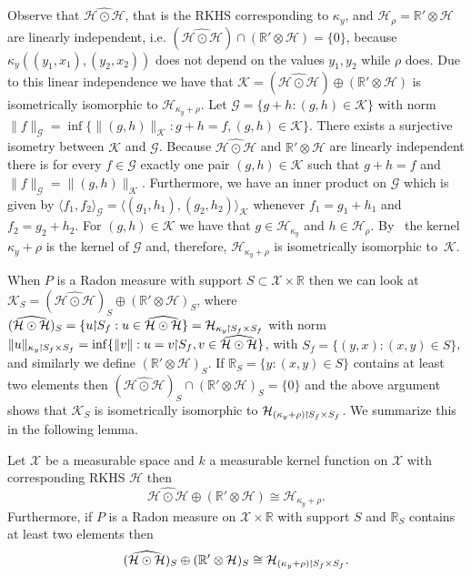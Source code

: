\documentclass[AHL,Unicode,longabstracts,published]{cedram}
\theoremstyle{remark}
\newcommand{\restrr}
{\!\!\upharpoonright\!\!}
\newcommand{\R}{\mathbb{R}}
\newcommand{\dR}{{\R'}}
\newcommand{\X}{\mathcal{X}}
\newcommand{\cH}{\mathcal{H}}
\newcommand{\clK}{\mathcal{K}}
\newcommand{\clG}{\mathcal{G}}
\newcommand*{\mk}{\mkern -1mu}
\begin{document}
Observe that $\widehat{\cH \odot \cH}$, that is the RKHS corresponding to $\kappa_y$, and $\cH_\rho = \dR \otimes \cH$ are linearly independent, i.e. $(\widehat{\cH\odot \cH}) \cap (\dR \otimes \cH) = \{0\}$, because $\kappa_y((y_1,x_1),(y_2,x_2))$ does not depend on the values $y_1,y_2$ while $\rho$ does. Due to this linear independence we have that $\clK = (\widehat{\cH \odot \cH}) \oplus (\dR \otimes \cH)$ is isometrically isomorphic to $\cH_{\kappa_y + \rho}$. Let $\clG = \{g + h : (g,h) \in \clK \}$ with norm $\|f \|_\clG = \inf \{\|(g,h)\|_{\clK} : g+ h = f, (g,h) \in \clK \}$. There exists a surjective isometry between $\clK$ and $\clG$. Because $\widehat{\cH \odot \cH}$ and $\dR \otimes \cH$ are linearly independent there is for every $ f\in \clG$ exactly one pair $(g,h) \in \clK$ such that $g + h = f$ and $\|f\|_\clG = \|(g,h)\|_\clK$. Furthermore, we have an inner product on $\clG$ which is given by $\langle f_1, f_2 \rangle_\clG = \langle (g_1,h_1), (g_2,h_2) \rangle_\clK$ whenever $f_1 = g_1 + h_1$ and $f_2 = g_2 + h_2$. For $(g,h) \in \clK$ we have that $g\in \cH_{\kappa_y}$ and $h \in \cH_{\rho}$. By~\cite[Theorem, p.~353]{ARON50} the kernel $\kappa_y + \rho$ is the kernel of $\clG$ and, therefore, $\cH_{\kappa_y + \rho}$ is isometrically isomorphic to~$\clK$.

When $P$ is a Radon measure with support $S \subset \X \times \R$ then we can look at $\clK_S = (\widehat{\cH \odot \cH})_S \oplus (\R' \otimes \cH)_S$, where $(\widehat{\cH \odot \cH})_S = \{u \restrr S_f : u\in \widehat{\cH \odot \cH}\}= \cH_{\kappa_y\mk\upharpoonright\mk S_f \times S_f} $ with norm $\|u\|_{\kappa_y\mk\upharpoonright\mk S_f \times S_f} = \inf \{ \|v\| : u = v \restrr S_f, v \in \widehat{\cH \odot \cH} \}$, with $S_f = \{(y,x) : (x,y) \in S\}$, and similarly we define $(\R' \otimes \cH)_S$. If $\R_S = \{y : (x,y) \in S \}$ contains at least two elements then $(\widehat{\cH \odot \cH})_S \cap (\R' \otimes \cH)_S = \{0\}$ and the above argument shows that $\clK_S$ is isometrically isomorphic to $\cH_{(\kappa_y + \rho)\mk\upharpoonright\mk S_f \times S_f}$. We summarize this in the following lemma.

\begin{lemm}\label{lem:iso_iso_simult}
Let $\X$ be a measurable space and $k$ a measurable kernel function on $\X$ with corresponding RKHS $\cH$ then
\[
\widehat{\cH \odot \cH}\oplus (\dR \otimes \cH) \cong \cH_{\kappa_y + \rho}.
\]
Furthermore, if $P$ is a Radon measure on $\X \times \R$ with support $S$ and $\R_S$ contains at least two elements then
\[
(\widehat{\cH \odot \cH})_S \oplus (\R' \otimes \cH)_S \cong \cH_{(\kappa_y + \rho)\mk\upharpoonright\mk S_f \times S_f}.
\]
\end{lemm}
\end{document}
